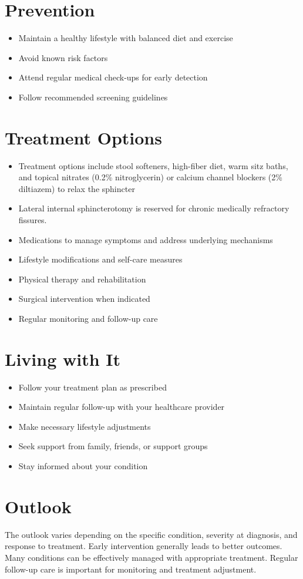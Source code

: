 \section{Prevention}
\begin{itemize}[noitemsep]
  \item Maintain a healthy lifestyle with balanced diet and exercise
  \item Avoid known risk factors
  \item Attend regular medical check-ups for early detection
  \item Follow recommended screening guidelines
\end{itemize}
\section{Treatment Options}
\begin{itemize}[noitemsep]
  \item Treatment options include stool softeners, high-fiber diet, warm sitz baths, and topical nitrates (0.2\% nitroglycerin) or calcium channel blockers (2\% diltiazem) to relax the sphincter
  \item Lateral internal sphincterotomy is reserved for chronic medically refractory fissures.
  \item Medications to manage symptoms and address underlying mechanisms
  \item Lifestyle modifications and self-care measures
  \item Physical therapy and rehabilitation
  \item Surgical intervention when indicated
  \item Regular monitoring and follow-up care
\end{itemize}
\section{Living with It}
\begin{itemize}[noitemsep]
  \item Follow your treatment plan as prescribed
  \item Maintain regular follow-up with your healthcare provider
  \item Make necessary lifestyle adjustments
  \item Seek support from family, friends, or support groups
  \item Stay informed about your condition
\end{itemize}
\section{Outlook}
The outlook varies depending on the specific condition, severity at diagnosis, and response to treatment. Early intervention generally leads to better outcomes. Many conditions can be effectively managed with appropriate treatment. Regular follow-up care is important for monitoring and treatment adjustment.
